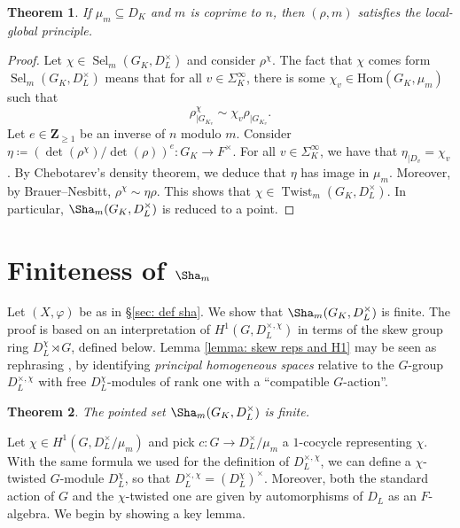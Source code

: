 \documentclass[a4paper,10pt]{amsart}
\theoremstyle{plain}
\newtheorem{theorem}{Theorem}[section]
\theoremstyle{definition}
\theoremstyle{remark}
\def\Z{\mathbf Z}
\def\mr#1{\mathrm{#1}}
\newcommand{\bD}{D_L}
\renewcommand{\hom}{\mr{Hom}}
\DeclareMathOperator{\Sel}{Sel}
\DeclareMathOperator{\Twist}{Twist}
\begin{document}
\begin{theorem}\label{thm : coprimality}
If \(\mu_m \subseteq D_K\) and \(m\) is coprime to \(n\), then \((\rho, m)\) satisfies the local-global principle.
\end{theorem}
\begin{proof}
Let \(\chi \in \Sel_m(G_K, \bD^\times)\) and consider \(\rho^\chi\). The fact that \(\chi\) comes form \(\Sel_m(G_K, \bD^\times)\) means that for all \(v \in \Sigma^\infty_K\), there is some \(\chi_v \in \hom(G_K, \mu_m)\) such that
\[
    \rho^\chi_{|G_{K_v}} \sim \chi_v\rho_{|G_{K_v}}.
\]
Let \(e \in \Z_{\ge 1}\) be an inverse of \(n\) modulo \(m\). Consider \(\eta \coloneqq (\det(\rho^\chi)/\det(\rho))^e \colon G_K \to F^\times\). For all \(v \in \Sigma^\infty_K\), we have that \(\eta_{|D_v} = \chi_v\). By Chebotarev's density theorem, we deduce that \(\eta\) has image in \(\mu_m\). Moreover, by Brauer--Nesbitt, \(\rho^\chi \sim \eta\rho\). This shows that \(\chi \in \Twist_m(G_K, \bD^\times)\). In particular, \(\Sha_m(G_K, \bD^\times)\) is reduced to a point.
\end{proof}

\section{Finiteness of \texorpdfstring{\(\Sha_m\)}{the Tate--Shafarevich group}}
Let \((X, \varphi)\) be as in \S\ref{sec: def sha}. We show that \(\Sha_m(G_K, \bD^\times)\) is finite. The proof is based on an interpretation of \(H^1(G, \bD^{\times, \chi})\) in terms of the skew group ring \(\bD^\chi \rtimes G\), defined below. Lemma \ref{lemma: skew reps and H1} may be seen as rephrasing \cite[Proposition~I.33]{Serre-Galois}, by identifying \emph{principal homogeneous spaces} relative to the \(G\)-group \(\bD^{\times, \chi}\) with free \(\bD^\chi\)-modules of rank one with a ``compatible \(G\)-action''.

\begin{theorem}\label{theorem: finite sha}
The pointed set \(\Sha_m(G_K, \bD^\times)\) is finite.
\end{theorem}

Let \(\chi \in H^1(G, \bD^{\times}/\mu_m)\) and pick \(c \colon G \to \bD^\times/\mu_m\) a \(1\)-cocycle representing \(\chi\).
With the same formula we used for the definition of \(\bD^{\times, \chi}\), we can define a \(\chi\)-twisted \(G\)-module \(\bD^\chi\), so that \(\bD^{\times, \chi} = (\bD^\chi)^\times\). Moreover, both the standard action of \(G\) and the \(\chi\)-twisted one are given by automorphisms of \(\bD\) as an \(F\)-algebra. We begin by showing a key lemma. 
\end{document}
